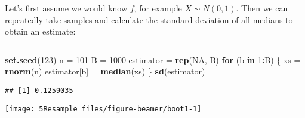 \documentclass[10pt,ignorenonframetext,]{beamer}
\newenvironment{Shaded}{\begin{snugshade}}{\end{snugshade}}
\newcommand{\ControlFlowTok}[1]{\textcolor[rgb]{0.13,0.29,0.53}{\textbf{#1}}}
\newcommand{\DecValTok}[1]{\textcolor[rgb]{0.00,0.00,0.81}{#1}}
\newcommand{\KeywordTok}[1]{\textcolor[rgb]{0.13,0.29,0.53}{\textbf{#1}}}
\newcommand{\NormalTok}[1]{#1}
\newcommand{\OperatorTok}[1]{\textcolor[rgb]{0.81,0.36,0.00}{\textbf{#1}}}
\newcommand{\OtherTok}[1]{\textcolor[rgb]{0.56,0.35,0.01}{#1}}
\newcommand{\StringTok}[1]{\textcolor[rgb]{0.31,0.60,0.02}{#1}}
\begin{document}
\begin{frame}[fragile]

Let's first assume we would know \(f\), for example \(X\sim N(0,1)\).
Then we can repeatedly take samples and calculate the standard deviation
of all medians to obtain an estimate:

\(~\)

\scriptsize

\begin{Shaded}
\begin{Highlighting}[]
\KeywordTok{set.seed}\NormalTok{(}\DecValTok{123}\NormalTok{)}
\NormalTok{n =}\StringTok{ }\DecValTok{101}
\NormalTok{B =}\StringTok{ }\DecValTok{1000}
\NormalTok{estimator =}\StringTok{ }\KeywordTok{rep}\NormalTok{(}\OtherTok{NA}\NormalTok{, B)}
\ControlFlowTok{for}\NormalTok{ (b }\ControlFlowTok{in} \DecValTok{1}\OperatorTok{:}\NormalTok{B) \{}
\NormalTok{    xs =}\StringTok{ }\KeywordTok{rnorm}\NormalTok{(n)}
\NormalTok{    estimator[b] =}\StringTok{ }\KeywordTok{median}\NormalTok{(xs)}
\NormalTok{\}}
\KeywordTok{sd}\NormalTok{(estimator)}
\end{Highlighting}
\end{Shaded}

\begin{verbatim}
## [1] 0.1259035
\end{verbatim}

\end{frame}

\begin{frame}

\begin{center}\texttt{[image: 5Resample\_files/figure-beamer/boot1-1]} \end{center}

\end{frame}
\end{document}
